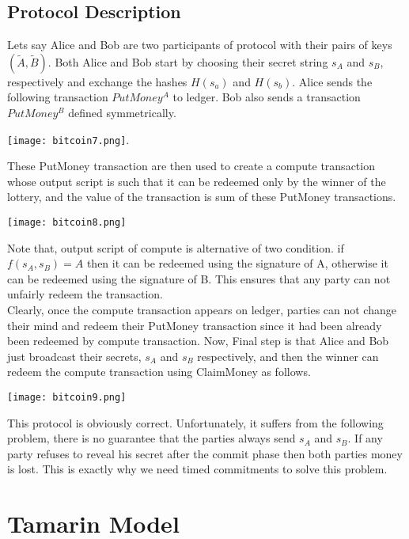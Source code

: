 \documentclass[a4paper]{article}
\begin{document}
\subsection{Protocol Description}
Lets say Alice and Bob are two participants of protocol with their pairs of keys $(\widetilde{A},\widetilde{B})$. Both Alice and Bob start by choosing their secret string $s_A$ and $s_B$, respectively and exchange the hashes $H(s_a)$ and $H(s_b)$. Alice sends the following transaction $PutMoney^A$ to ledger. Bob also sends a transaction $PutMoney^B$ defined symmetrically.\\
\begin{center}
\texttt{[image: bitcoin7.png]}.\\
\end{center}
These PutMoney transaction are then used to create a compute transaction whose output script is such that it can be redeemed only by the winner of the lottery, and the value of the transaction is sum  of these PutMoney transactions.\\
\begin{center}
\texttt{[image: bitcoin8.png]}\\
\end{center}
Note that, output script of compute is alternative of two condition. if $f(s_A, s_B) = A$ then it can be redeemed using the signature of A, otherwise it can be redeemed using the signature of B. This ensures that any party can not unfairly redeem the transaction.\\ Clearly, once the compute transaction appears on ledger, parties can not change their mind and redeem their PutMoney transaction since it had been already been redeemed by compute transaction. Now, Final step is that Alice and Bob just broadcast their secrets, $s_A$ and $s_B$ respectively, and then the winner can redeem the compute transaction using ClaimMoney as follows.\\

\begin{center}
\texttt{[image: bitcoin9.png]}\\
\end{center}
This protocol is obviously correct. Unfortunately, it suffers from the following problem, there is no guarantee that the parties always send $s_A$ and $s_B$. If any party refuses to reveal his secret after the commit phase then both parties money is lost. This is exactly why we need timed commitments to solve this problem.
\section{Tamarin Model}
\end{document}
